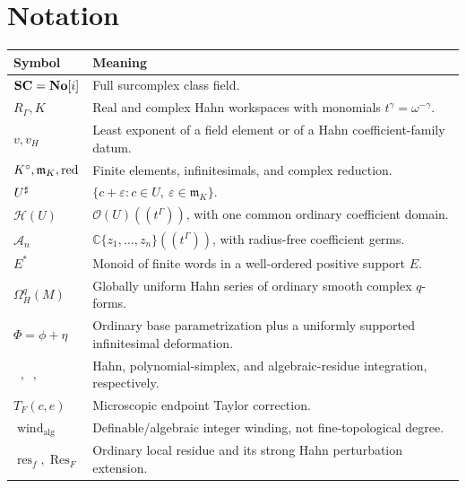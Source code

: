 \documentclass[11pt,letterpaper]{article}
\theoremstyle{definition}
\theoremstyle{remark}
\newcommand{\C}{\mathbb C}\newcommand{\R}{\mathbb R}\newcommand{\Q}{\mathbb Q}\newcommand{\Z}{\mathbb Z}\newcommand{\N}{\mathbb N}
\newcommand{\OO}{\mathcal O}\newcommand{\HH}{\mathcal H}\newcommand{\A}{\mathscr A}\newcommand{\m}{\mathfrak m}
\newcommand{\Res}{\operatorname{Res}}\newcommand{\res}{\operatorname{res}}\newcommand{\ord}{\operatorname{ord}}\newcommand{\Tr}{\operatorname{Tr}}
\newcommand{\wind}{\operatorname{wind}}\newcommand{\Ind}{\operatorname{Ind}}\newcommand{\id}{\operatorname{id}}
\newcommand{\vH}{v_{\!H}}\newcommand{\re}{\operatorname{Re}}\newcommand{\im}{\operatorname{Im}}
\newcommand{\HInt}{\mathop{\int^{\!H}}\nolimits}\newcommand{\HCoint}{\mathop{\oint^{\!H}}\nolimits}
\newcommand{\PInt}{\mathop{\int^{\!\mathrm{pol}}}\nolimits}\newcommand{\ACoint}{\mathop{\oint^{\!\mathrm{alg}}}\nolimits}
\numberwithin{equation}{section}
\begin{document}
\section{Notation}\label{app:notation}
\begin{center}\small
\begin{tabular}{@{}L{0.27\textwidth}L{0.63\textwidth}@{}}
\toprule
Symbol & Meaning\\\midrule
$\mathbf{SC}=\mathbf{No}[i]$ & Full surcomplex class field.\\[0.35em]
$R_\Gamma,K$ & Real and complex Hahn workspaces with monomials $t^\gamma=\omega^{-\gamma}$.\\[0.35em]
$v,\vH$ & Least exponent of a field element or of a Hahn coefficient-family datum.\\[0.35em]
$K^\circ,\m_K,\red$ & Finite elements, infinitesimals, and complex reduction.\\[0.35em]
$U^{\sharp}$ & $\{c+\varepsilon:c\in U,\ \varepsilon\in\m_K\}$.\\[0.35em]
$\HH(U)$ & $\OO(U)((t^\Gamma))$, with one common ordinary coefficient domain.\\[0.35em]
$\A_n$ & $\C\{z_1,\ldots,z_n\}((t^\Gamma))$, with radius-free coefficient germs.\\[0.35em]
$E^*$ & Monoid of finite words in a well-ordered positive support $E$.\\[0.35em]
$\Omega_H^q(M)$ & Globally uniform Hahn series of ordinary smooth complex $q$-forms.\\[0.35em]
$\Phi=\phi+\eta$ & Ordinary base parametrization plus a uniformly supported infinitesimal deformation.\\[0.35em]
$\HInt,\PInt,\ACoint$ & Hahn, polynomial-simplex, and algebraic-residue integration, respectively.\\[0.35em]
$T_F(c,e)$ & Microscopic endpoint Taylor correction.\\[0.35em]
$\wind_{\mathrm{alg}}$ & Definable/algebraic integer winding, not fine-topological degree.\\[0.35em]
$\res_f,\Res_F$ & Ordinary local residue and its strong Hahn perturbation extension.\\
\bottomrule
\end{tabular}
\end{center}
\end{document}
